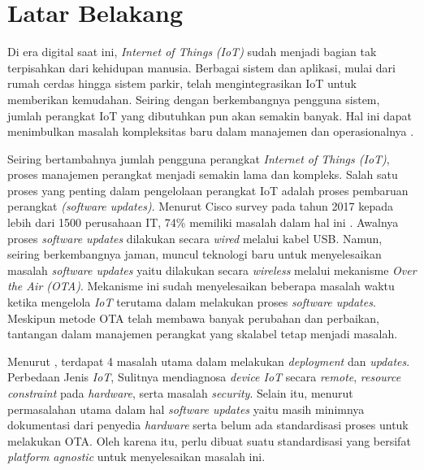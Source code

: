 \section{Latar Belakang}
\label{sec:latar-belakang}

Di era digital saat ini, \textit{Internet of Things} \textit{(IoT)} sudah menjadi bagian tak terpisahkan dari kehidupan manusia. Berbagai sistem dan aplikasi, mulai dari rumah cerdas hingga sistem parkir, telah mengintegrasikan IoT untuk memberikan kemudahan. Seiring dengan berkembangnya pengguna sistem, jumlah perangkat IoT yang dibutuhkan pun akan semakin banyak. Hal ini dapat menimbulkan masalah kompleksitas baru dalam manajemen dan operasionalnya \parencite{IOTSmartCity}.

Seiring bertambahnya jumlah pengguna perangkat \textit{Internet of Things (IoT)}, proses manajemen perangkat menjadi semakin lama dan kompleks. Salah satu proses yang penting dalam pengelolaan perangkat IoT adalah proses pembaruan perangkat \textit{(software updates)}. Menurut Cisco survey pada tahun 2017 kepada lebih dari 1500 perusahaan IT, 74\% memiliki masalah dalam hal ini \parencite{RemoteDeployment}. Awalnya proses \textit{software updates} dilakukan secara \textit{wired} melalui kabel USB. Namun, seiring berkembangnya jaman, muncul teknologi baru untuk menyelesaikan masalah \textit{software updates} yaitu dilakukan secara \textit{wireless} melalui mekanisme \textit{Over the Air (OTA)}. Mekanisme ini sudah menyelesaikan beberapa masalah waktu ketika mengelola \textit{IoT} terutama dalam melakukan proses \textit{software updates}. Meskipun metode OTA telah membawa banyak perubahan dan perbaikan, tantangan dalam manajemen perangkat yang skalabel tetap menjadi masalah. \parencite{ElJaouhari2022}

Menurut \parencite{RemoteDeployment}, terdapat 4 masalah utama dalam melakukan \textit{deployment} dan \textit{updates}. Perbedaan Jenis \textit{IoT}, Sulitnya mendiagnosa \textit{device IoT} secara \textit{remote}, \textit{resource constraint} pada \textit{hardware}, serta masalah \textit{security}. Selain itu, menurut \parencite{studyovertheair1} permasalahan utama dalam hal \textit{software updates} yaitu masih minimnya dokumentasi dari penyedia \textit{hardware} serta belum ada standardisasi proses untuk melakukan OTA. Oleh karena itu, perlu dibuat suatu standardisasi yang bersifat \textit{platform agnostic} untuk menyelesaikan masalah ini. 

